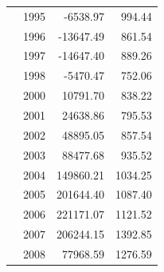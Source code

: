 \documentclass[12pt,a4paper]{article}
\begin{document}
\begin{center}
\begin{tabular}{llrr}
&              1995 &      -6538.97 &           994.44 \\
&              1996 &     -13647.49 &           861.54 \\
&              1997 &     -14647.40 &           889.26 \\
&              1998 &      -5470.47 &           752.06 \\
&              2000 &      10791.70 &           838.22 \\
&              2001 &      24638.86 &           795.53 \\
&              2002 &      48895.05 &           857.54 \\
&              2003 &      88477.68 &           935.52 \\
&              2004 &     149860.21 &          1034.25 \\
&              2005 &     201644.40 &          1087.40 \\
&              2006 &     221171.07 &          1121.52 \\
&              2007 &     206244.15 &          1392.85 \\
&              2008 &      77968.59 &          1276.59 \\
\hline
\hline
\end{tabular}
\end{center}
\end{document}
